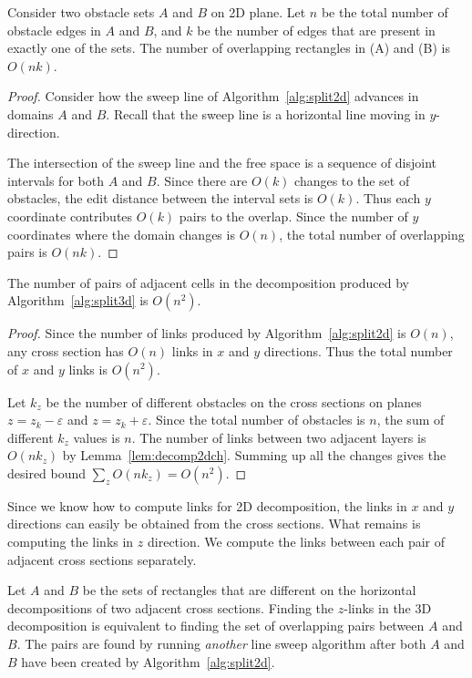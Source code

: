 \documentclass[english,gradu]{tktltiki2018}
\begin{document}
\begin{lem}\label{lem:decomp2dch}
Consider two obstacle sets $A$ and $B$ on 2D plane.
Let $n$ be the total number of obstacle edges in $A$ and $B$, and $k$ be the number of edges that are present in exactly one of the sets.
The number of overlapping rectangles in (A) and (B) is $O(nk)$.
\end{lem}
\begin{proof}
Consider how the sweep line of Algorithm~\ref{alg:split2d} advances in domains $A$ and $B$.
Recall that the sweep line is a horizontal line moving in $y$-direction.

The intersection of the sweep line and the free space is a sequence of disjoint intervals for both $A$ and $B$.
Since there are $O(k)$ changes to the set of obstacles, the edit distance between the interval sets is $O(k)$.
Thus each $y$ coordinate contributes $O(k)$ pairs to the overlap.
Since the number of $y$ coordinates where the domain changes is $O(n)$, the total number of overlapping pairs is $O(nk)$.
\end{proof}

\begin{lem}\label{lem:split3dcount}The number of pairs of adjacent cells in the decomposition produced by Algorithm~\ref{alg:split3d} is $O(n^2)$.\end{lem}
\begin{proof}
Since the number of links produced by Algorithm~\ref{alg:split2d} is $O(n)$, any cross section has $O(n)$ links in $x$ and $y$ directions.
Thus the total number of $x$ and $y$ links is $O(n^2)$.

Let $k_z$ be the number of different obstacles on the cross sections on planes $z=z_k-\varepsilon$ and $z=z_k+\varepsilon$.
Since the total number of obstacles is $n$, the sum of different $k_z$ values is $n$.
The number of links between two adjacent layers is $O(nk_z)$ by Lemma~\ref{lem:decomp2dch}.
Summing up all the changes gives the desired bound $\sum_z O(nk_z) = O(n^2)$.
\end{proof}

Since we know how to compute links for 2D decomposition, the links in $x$ and $y$ directions can easily be obtained from the cross sections.
What remains is computing the links in $z$ direction.
We compute the links between each pair of adjacent cross sections separately.

Let $A$ and $B$ be the sets of rectangles that are different on the horizontal decompositions of two adjacent cross sections.
Finding the $z$-links in the 3D decomposition is equivalent to finding the set of overlapping pairs between $A$ and $B$.
The pairs are found by running \emph{another} line sweep algorithm after both $A$ and $B$ have been created by Algorithm~\ref{alg:split2d}.
\end{document}
